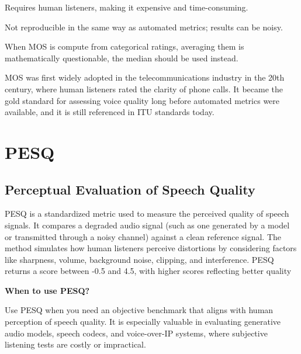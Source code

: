 {
\item Requires human listeners, making it expensive and time-consuming.
\item Not reproducible in the same way as automated metrics; results can be noisy.
\item When MOS is compute from categorical ratings, averaging them is mathematically questionable, the median should be used instead.
}

\clearpage

\thispagestyle{customstyle}

{MOS was first widely adopted in the telecommunications industry in the 20th century, where human listeners rated the clarity of phone calls.
It became the gold standard for assessing voice quality long before automated metrics were available, and it is still referenced in
ITU standards today.}

\clearpage
\thispagestyle{genaistyle}
\section{PESQ}
\subsection{Perceptual Evaluation of Speech Quality}


PESQ is a standardized metric used to measure the perceived quality of speech signals. It compares a degraded audio signal
(such as one generated by a model or transmitted through a noisy channel) against a clean reference signal. The method simulates how human
listeners perceive distortions by considering factors like sharpness, volume, background noise, clipping, and interference.
PESQ returns a score between -0.5 and 4.5, with higher scores reflecting better quality

\textbf{When to use PESQ?}

Use PESQ when you need an objective benchmark that aligns with human perception of speech quality. It is especially valuable in evaluating
generative audio models, speech codecs, and voice-over-IP systems, where subjective listening tests are costly or impractical.

